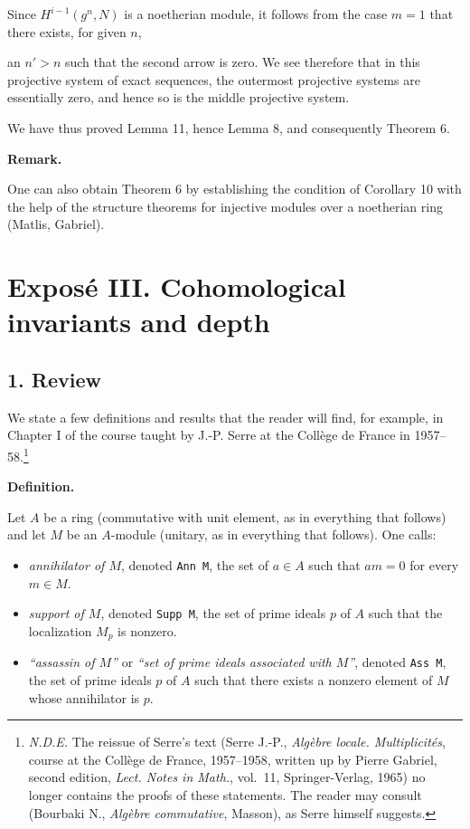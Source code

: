 \documentclass[
  11pt,
  a4paper,
]{book}
\providecommand{\tightlist}{%
  \setlength{\itemsep}{0pt}\setlength{\parskip}{0pt}}
\begin{document}
Since \(H^{i-1}(g^{n}, N)\) is a noetherian module, it follows from the
case \(m = 1\) that there exists, for given \(n\),

an \(n' > n\) such that the second arrow is zero. We see therefore that
in this projective system of exact sequences, the outermost projective
systems are essentially zero, and hence so is the middle projective
system.

We have thus proved Lemma 11, hence Lemma 8, and consequently Theorem 6.

\textbf{Remark.}

One can also obtain Theorem 6 by establishing the condition of Corollary
10 with the help of the structure theorems for injective modules over a
noetherian ring (Matlis, Gabriel).

\chapter{Exposé III. Cohomological invariants and
depth}\label{exposuxe9-iii.-cohomological-invariants-and-depth}

\section{1. Review}\label{review}

We state a few definitions and results that the reader will find, for
example, in Chapter I of the course taught by J.-P. Serre at the Collège
de France in 1957--58.\footnote{\emph{N.D.E.} The reissue of Serre's
  text (Serre J.-P., \emph{Algèbre locale. Multiplicités}, course at the
  Collège de France, 1957--1958, written up by Pierre Gabriel, second
  edition, \emph{Lect. Notes in Math.}, vol.~11, Springer-Verlag, 1965)
  no longer contains the proofs of these statements. The reader may
  consult (Bourbaki N., \emph{Algèbre commutative}, Masson), as Serre
  himself suggests.}

\textbf{Definition.}

Let \(A\) be a ring (commutative with unit element, as in everything
that follows) and let \(M\) be an \(A\)-module (unitary, as in
everything that follows). One calls:

\begin{itemize}
\tightlist
\item
  \emph{annihilator of \(M\)}, denoted \texttt{Ann\ M}, the set of
  \(a \in A\) such that \(am = 0\) for every \(m \in M\).
\item
  \emph{support of \(M\)}, denoted \texttt{Supp\ M}, the set of prime
  ideals \(p\) of \(A\) such that the localization \(M_{p}\) is nonzero.
\item
  \emph{``assassin of \(M\)''} or \emph{``set of prime ideals associated
  with \(M\)''}, denoted \texttt{Ass\ M}, the set of prime ideals \(p\)
  of \(A\) such that there exists a nonzero element of \(M\) whose
  annihilator is \(p\).
\end{itemize}
\end{document}

